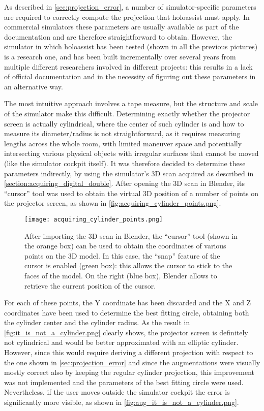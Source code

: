 As described in \autoref{sec:projection_error}, a number of simulator-specific parameters are required to correctly compute the projection that \gls{holoassist} must apply. In commercial simulators these parameters are usually available as part of the documentation and are therefore straightforward to obtain. However, the simulator in which \gls{holoassist} has been tested (shown in all the previous pictures) is a research one, and has been built incrementally over several years from multiple different researchers involved in different projects: this results in a lack of official documentation and in the necessity of figuring out these parameters in an alternative way.

The most intuitive approach involves a tape measure, but the structure and scale of the simulator make this difficult. Determining exactly whether the projector screen is actually cylindrical, where the center of such cylinder is and how to measure its diameter/radius is not straightforward, as it requires measuring lengths across the whole room, with limited maneuver space and potentially intersecting various physical objects with irregular surfaces that cannot be moved (like the simulator cockpit itself). It was therefore decided to determine these parameters indirectly, by using the simulator's 3D scan acquired as described in \autoref{section:acquiring_digital_double}. After opening the 3D scan in Blender, its \enquote{cursor} tool was used to obtain the virtual 3D position of a number of points on the projector screen, as shown in \autoref{fig:acquiring_cylinder_points.png}.

\begin{figure}
  \centering
  \texttt{[image: acquiring\_cylinder\_points.png]}
  \caption{After importing the 3D scan in Blender, the \enquote{cursor} tool (shown in the orange box) can be used to obtain the coordinates of various points on the 3D model. In this case, the \enquote{snap} feature of the cursor is enabled (green box): this allows the cursor to stick to the faces of the model. On the right (blue box), Blender allows to retrieve the current position of the cursor.}\label{fig:acquiring_cylinder_points.png}
\end{figure}

For each of these points, the Y coordinate has been discarded and the X and Z coordinates have been used to determine the best fitting circle, obtaining both the cylinder center and the cylinder radius. As the result in \autoref{fig:it_is_not_a_cylinder.png} clearly shows, the projector screen is definitely not cylindrical and would be better approximated with an elliptic cylinder. However, since this would require deriving a different projection with respect to the one shown in \autoref{sec:projection_error} and since the augmentations were visually mostly correct also by keeping the regular cylinder projection, this improvement was not implemented and the parameters of the best fitting circle were used. Nevertheless, if the user moves outside the simulator cockpit the error is significantly more visible, as shown in \autoref{fig:aug_it_is_not_a_cylinder.png}.

